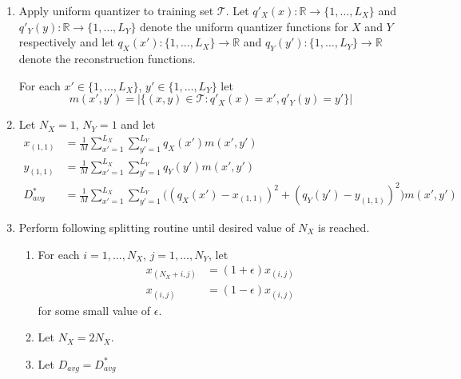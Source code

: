 \documentclass[10pt]{article}
\begin{document}
\begin{enumerate}

    \item Apply uniform quantizer to training set $\mathcal{T}$. Let
        $q'_X(x):\mathbb{R} \rightarrow \{1,\ldots,L_X\}$
        and
        $q'_Y(y):\mathbb{R} \rightarrow \{1,\ldots,L_Y\}$
        denote the uniform quantizer functions for $X$ and $Y$ respectively and
        let $q_X(x'):\{1,\ldots,L_X\} \rightarrow \mathbb{R}$
        and
        $q_Y(y'):\{1,\ldots,L_Y\} \rightarrow \mathbb{R}$
        denote the reconstruction functions.

        For each $x'\in \{1,\ldots,L_X\}$, $y'\in \{1,\ldots,L_Y\}$ let
        \begin{equation*}
            m(x',y') = |\{(x,y) \in \mathcal{T} : q'_X(x) = x', q'_Y(y) = y'\}|
        \end{equation*}

    \item Let $N_X = 1$, $N_Y = 1$ and let
        \begin{align*}
            x_{(1,1)} &= \frac{1}{M}
            \sum_{x'=1}^{L_X} \sum_{y'=1}^{L_Y} q_X(x') m(x',y')
            \\
            y_{(1,1)} &= \frac{1}{M}
            \sum_{x'=1}^{L_X} \sum_{y'=1}^{L_Y} q_Y(y') m(x',y')
            \\
            D^*_{avg} &= \frac{1}{M} \sum_{x'=1}^{L_X} \sum_{y'=1}^{L_Y}
            \big( {(q_X(x')-x_{(1,1)})}^2 + {(q_Y(y')-y_{(1,1)})}^2 \big)
            m(x',y')
        \end{align*}

    \item Perform following splitting routine until desired value of $N_X$ is
        reached.
        \begin{enumerate}

            \item For each $i = 1,\ldots, N_X$, $j = 1,\ldots, N_Y$, let
                \begin{align*}
                    x_{(N_X+i,j)} &= (1+\epsilon)x_{(i,j)} \\
                    x_{(i,j)} &= (1-\epsilon)x_{(i,j)}
                \end{align*}
                for some small value of $\epsilon$.

            \item Let $N_X = 2N_X$.

            \item Let $D_{avg} = D^*_{avg}$


\end{enumerate}
\end{enumerate}
\end{document}
